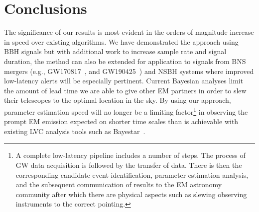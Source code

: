\documentclass{article}
\begin{document}
%
%

%
%
%
\section{Conclusions}


%
%
The significance of our results is most evident in the orders of magnitude
increase in speed over existing algorithms. We have demonstrated the approach
using \ac{BBH} signals but with additional work to increase sample rate
and signal duration, the method can also be extended for application to
signals from \ac{BNS} mergers (e.g., GW170817~\cite{PhysRevLett.119.161101},
and GW190425~\cite{2020ApJ...892L...3A}) and \ac{NSBH} systems where
improved low-latency alerts will be especially pertinent. Current Bayesian 
analyses limit the amount of lead time we are able to give other 
\ac{EM} partners in order to slew their telescopes to the 
optimal location in the sky. By using our
approach, parameter estimation speed will no longer be a limiting
factor\footnote{A complete low-latency pipeline includes a number of
steps. The process of \ac{GW} data acquisition is followed by the transfer of
data. There is then the corresponding candidate event identification,
parameter estimation analysis, and the subsequent communication of results to
the \ac{EM} astronomy community after which there are physical aspects such as
slewing observing instruments to the correct pointing.} in observing the prompt
\ac{EM} emission expected on shorter time scales than is achievable with
existing \ac{LVC} analysis tools such as Bayestar~\cite{2016PhRvD..93b4013S}.
\end{document}
